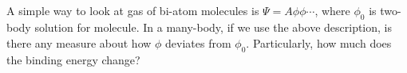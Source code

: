 \subsection{}
A simple way to look at gas of bi-atom molecules is $\Psi=A\phi\phi\cdots$, where $\phi_{0}$ is two-body solution for molecule. In a many-body, if we use the above description, is there any measure about how $\phi$ deviates from $\phi_{0}$.  Particularly, how much does the binding energy change?